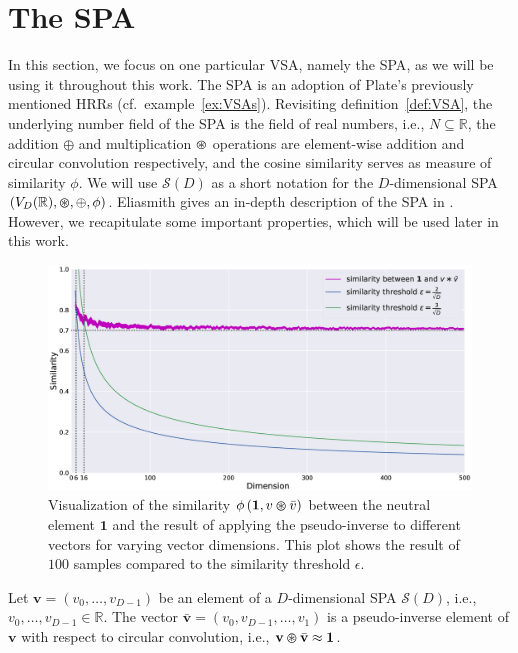 \section{The \acl{SPA}}
\label{sec:spa}

In this section, we focus on one particular \ac{VSA}, namely the \ac{SPA}, as we will be using it throughout this work.
The \ac{SPA} is an adoption of Plate's previously mentioned \acp{HRR} (cf.\ example~\ref{ex:VSAs}).
Revisiting definition~\ref{def:VSA}, the underlying number field of the \ac{SPA} is the field of real numbers, i.e., $N \subseteq \mathbb{R}$, the addition $\oplus$ and multiplication $\varoast$ operations are element-wise addition and circular convolution respectively, and the cosine similarity serves as measure of similarity $\phi$.
We will use $\mathcal{S}(D)$ as a short notation for the $D$-dimensional \ac{SPA} $(V_{D}(\mathbb{R}), \varoast, \oplus, \phi)$.
Eliasmith gives an in-depth description of the \ac{SPA} in \textcite{Eliasmith2013}.
However, we recapitulate some important properties, which will be used later in this work.
\begin{figure}[t!]
	\centering
	\includegraphics[width=1.0\textwidth]{imgs/pseudo_inverse_tsplot.eps}
	\caption{Visualization of the similarity $\phi\left(\mathbf{1}, v \varoast \bar{v}\right)$ between the neutral element $\mathbf{1}$ and the result of applying the pseudo-inverse to different vectors for varying vector dimensions. This plot shows the result of $100$ samples compared to the similarity threshold $\epsilon$.}
	\label{fig:pseudo_inv}
\end{figure}
\begin{lemma}
	\label{lemma:spa_pseudo_inv}
	Let $ \mathbf{v}=\left(v_0, \ldots, v_{D-1}\right)$ be an element of a $D$-dimensional \ac{SPA} $\mathcal{S}(D)$, i.e., $v_0, \ldots, v_{D-1} \in \mathbb{R}$.
	The vector $\bar{\mathbf{v}}=\left(v_0, v_{D-1}, \ldots, v_{1}\right)$ is a pseudo-inverse element of $ \mathbf{v}$ with respect to circular convolution, i.e., $ \mathbf{v} \varoast \bar{\mathbf{v}} \approx \mathbf{1}$.
\end{lemma}
